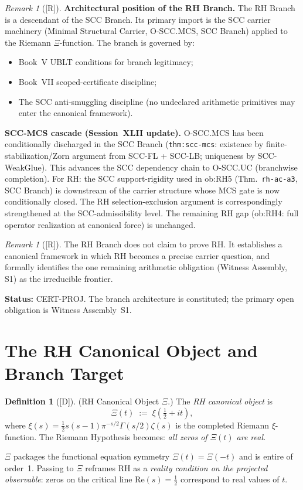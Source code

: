 \documentclass[12pt,oneside]{amsbook}
\theoremstyle{plain}
\theoremstyle{definition}
\newtheorem{definition}[theorem]{Definition}
\theoremstyle{remark}
\newtheorem{remark}[theorem]{Remark}
\newcommand{\status}[1]{\textup{[#1]}}
\begin{document}
\begin{remark}[\status{R}]
\textbf{Architectural position of the RH Branch.}
The RH Branch is a descendant of the SCC Branch. Its primary
import is the SCC carrier machinery (Minimal Structural Carrier,
O-SCC.MCS, SCC Branch) applied to the Riemann $\Xi$-function.
The branch is governed by:
\begin{itemize}
 \item Book~V UBLT conditions for branch legitimacy;
 \item Book~VII scoped-certificate discipline;
 \item The SCC anti-smuggling discipline (no undeclared arithmetic
 primitives may enter the canonical framework).
\end{itemize}
\textbf{SCC-MCS cascade (Session~XLII update).}
O-SCC.MCS has been conditionally discharged in the SCC Branch
(\texttt{thm:scc-mcs}: existence by finite-stabilization/Zorn
argument from SCC-FL + SCC-LB; uniqueness by SCC-WeakGlue).
This advances the SCC dependency chain to O-SCC.UC (branchwise
completion). For RH: the SCC support-rigidity used in ob:RH5
(Thm.~\texttt{rh-ac-a3}, SCC Branch) is downstream of the
carrier structure whose MCS gate is now conditionally closed.
The RH selection-exclusion argument is correspondingly strengthened
at the SCC-admissibility level. The remaining RH gap (ob:RH4:
full operator realization at canonical force) is unchanged.
\end{remark}

\begin{remark}[\status{R}]
The RH Branch does not claim to prove RH. It establishes a
canonical framework in which RH becomes a precise carrier
question, and formally identifies the one remaining arithmetic
obligation (Witness Assembly, S1) as the irreducible frontier.

\textbf{Status:} CERT-PROJ. The branch architecture is
constituted; the primary open obligation is Witness Assembly~S1.
\end{remark}

\section{The RH Canonical Object and Branch Target}
\label{sec:rh-object}

\begin{definition}[\status{D}]\label{def:rh-canonical-object}
\textup{(RH Canonical Object $\Xi$.)}
The \emph{RH canonical object} is
\[
 \Xi(t) \;:=\; \xi\!\left(\tfrac{1}{2} + it\right),
\]
where $\xi(s) = \tfrac{1}{2}s(s-1)\pi^{-s/2}\Gamma(s/2)\zeta(s)$
is the completed Riemann $\xi$-function. The Riemann Hypothesis
becomes: \emph{all zeros of $\Xi(t)$ are real.}

$\Xi$ packages the functional equation symmetry $\Xi(t) = \Xi(-t)$
and is entire of order~1. Passing to $\Xi$ reframes RH as a
\emph{reality condition on the projected observable}: zeros on the
critical line $\mathrm{Re}(s) = \tfrac{1}{2}$ correspond to real
values of $t$.
\end{definition}
\end{document}
